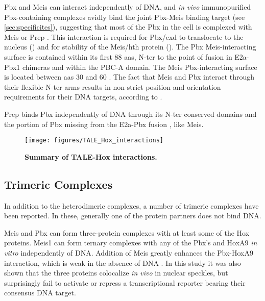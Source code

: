 Pbx and Meis can interact independently of DNA, and \textit{in vivo} immunopurified Pbx-containing complexes avidly bind the joint Pbx-Meis binding target (see \ref{sec:specificites}), suggesting that most of the Pbx in the cell is complexed with Meis or Prep \parencite{Knoepfler1997, Chang1997}. This interaction is required for Pbx/exd to translocate to the nucleus (\cite{Rieckhof1997}) and for stability of the Meis/\ac{hth} protein (\cite{Abu-Shaar1998}). The Pbx Meis-interacting surface is contained within its first 88 \acp{aa}, \ac{N-ter} to the point of fusion in E2a-Pbx1 chimeras and within the PBC-A domain. The Meis Pbx-interacting surface is located between \acp{aa} 30 and 60 \parencite{Chang1997}. The fact that Meis and Pbx interact through their flexible \ac{N-ter} arms results in non-strict position and orientation requirements for their DNA targets, according to \textcite{Jacobs1999}.

Prep binds Pbx independently of DNA through its \ac{N-ter} conserved domains and the portion of Pbx missing from the E2a-Pbx fusion \parencite{Berthelsen1998}, like Meis. 


\begin{figure}[]
  
  \centering
  \texttt{[image: figures/TALE\_Hox\_interactions]}
  \caption[Summary of TALE-Hox interactions]{\textbf{Summary of TALE-Hox interactions.}}
  \label{fig:TALE_Hox_interactions}
\end{figure}


\subsection{Trimeric Complexes}

In addition to the heterodimeric complexes, a number of trimeric complexes have been reported. In these, generally one of the protein partners does not bind DNA. 

Meis and Pbx can form three-protein complexes with at least some of the Hox proteins. Meis1 can form ternary complexes with any of the Pbx's and HoxA9 \textit{in vitro} independently of DNA. Addition of Meis greatly enhances the  Pbx-HoxA9 interaction, which is weak in the absence of DNA \parencite{Shen1999}. In this study it was also shown that the three proteins colocalize \textit{in vivo} in nuclear speckles, but surprisingly fail to activate or repress a transcriptional reporter bearing their consensus DNA target. 

